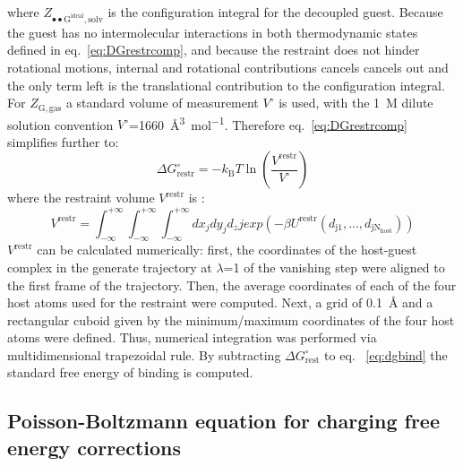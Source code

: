 \documentclass[11pt,oneside,a4paper]{article}
\begin{document}
where $Z_{\mathrm{\bullet\bullet G^{\mathrm{ideal}},solv}}$ is the configuration integral for the decoupled guest. Because the guest  has no intermolecular interactions in both thermodynamic states defined in eq.~\ref{eq:DGrestrcomp}, and because the restraint does not hinder rotational motions, internal and rotational contributions cancels cancels out and the only term left is the translational contribution to the configuration integral. For $Z_{\mathrm{G,gas}}$ a standard volume of measurement $V^\circ$ is used, with the \SI{1}{M} dilute solution convention $V^\circ$=\SI{1660}{\AA^3 mol^{-1}}. Therefore eq.~\ref{eq:DGrestrcomp} simplifies further to:
\begin{equation}
\label{eq:DGrestr2}
\Delta G_{\mathrm{restr}}^\circ = -k_{\mathrm{B}}T\ln \left ( \frac{ V^\mathrm{restr}}{V^\circ} \right )
\end{equation}
where the restraint volume $V^\mathrm{restr}$ is :
\begin{equation}
 \label{eq:vrestr}
 V^\mathrm{restr}= \int_{-\infty}^{+\infty}
 \int_{-\infty}^{+\infty}
 \int_{-\infty}^{+\infty}
 dx_jdy_jd_zj exp(-\beta U^\mathrm{restr}(d_\mathrm{j1},...,d_\mathrm{jN_{host}}))
\end{equation}
$V^\mathrm{restr}$ can be calculated numerically: first, the coordinates of the host-guest complex in the generate trajectory at $\lambda$=1 of the vanishing step were aligned to the first frame of the trajectory. Then, the average coordinates of each of the four host atoms used for the restraint were computed. Next, a grid of \SI{0.1}{\AA} and  a rectangular cuboid given by the minimum/maximum coordinates of the four host atoms were defined.
Thus, numerical integration was performed via multidimensional trapezoidal rule.
By subtracting $\Delta G_{\mathrm{rest}}^\circ$ to eq. ~\ref{eq:dgbind} the standard free energy of binding is computed.

\subsection{Poisson-Boltzmann equation for charging free energy corrections}
\label{sec:pbcorrection}
\end{document}
